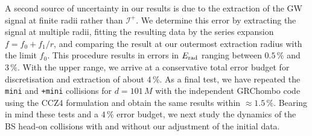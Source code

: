A second source of uncertainty in our results is due
to the extraction of the GW signal at finite radii
rather than $\mathcal{I}^+$. We determine this error
by extracting the signal at multiple radii, fitting
the resulting data by the series expansion
$f=f_0+f_1/r$, and comparing the result at our outermost
extraction radius with the limit $f_0$. This procedure
results in errors in $E_{\rm rad}$ ranging between $0.5\,\%$
and $3\,\%$. With the upper range, we arrive at
a conservative total error budget for discretisation and
extraction of about $4\,\%$.
As a final test, we have repeated the {\tt mini} and
{\tt +mini} collisions for $d=101\,M$
with the independent {\sc GRChombo}
code \cite{Clough:2015sqa,Radia:2021} using the CCZ4 formulation \cite{Alic:2011gg} and obtain the same results within $\approx 1.5\,\%$.
Bearing in mind these tests and a $4\,\%$ error budget,
we next study the dynamics of the BS head-on collisions
with and without our adjustment of the initial data.


